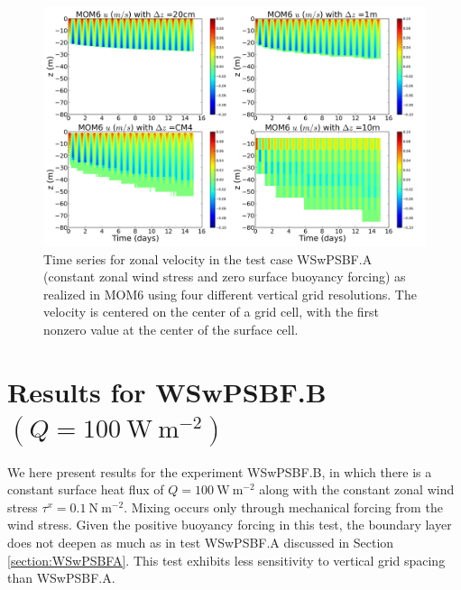 \begin{figure}[h!t]
\begin{center}
\includegraphics[angle=0,width=14cm]{./figs/MOM6/WSwPSBF_A_MOM6_zonal_velocity.png}
\caption[Zonal velocity from MOM6 for WSwPSBF.A ]{\sf Time series for
  zonal velocity in the test case WSwPSBF.A (constant zonal wind
  stress and zero surface buoyancy forcing) as realized in MOM6 using
  four different vertical grid resolutions. The velocity is centered
  on the center of a grid cell, with the first nonzero value at the
  center of the surface cell.}
\label{fig:WSwPSBF_A_MOM6_zonal}
\end{center}
\end{figure}



\clearpage 


\section{Results for WSwPSBF.B $(Q=100~\mbox{W}~\mbox{m}^{-2})$}
\label{section:WSwPSBFB}

We here present results for the experiment WSwPSBF.B, in which there
is a constant surface heat flux of $Q=100~\mbox{W}~\mbox{m}^{-2}$
along with the constant zonal wind stress $\tau^{x} =
0.1~\mbox{N}~\mbox{m}^{-2}$.  Mixing occurs only through mechanical
forcing from the wind stress.  Given the positive buoyancy forcing in
this test, the boundary layer does not deepen as much as in test
WSwPSBF.A discussed in Section \ref{section:WSwPSBFA}.  This test
exhibits less sensitivity to vertical grid spacing than WSwPSBF.A.



